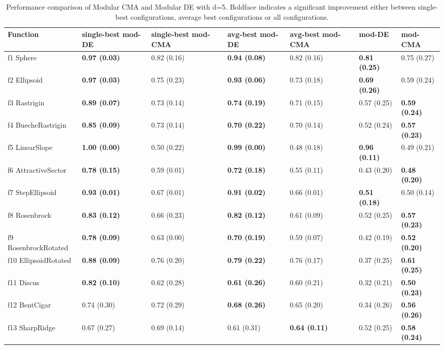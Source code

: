 \begin{table}
\caption{Performance comparison of Modular CMA and Modular DE with d=5. Boldface indicates a significant improvement either between single-best configurations, average best configurations or all configurations.}
\begin{tabular}{lllllll}
\toprule
Function & single-best mod-DE & single-best mod-CMA & avg-best mod-DE & avg-best mod-CMA & mod-DE & mod-CMA \\
\midrule
f1 Sphere & \textbf{0.97 (0.03)} & 0.82 (0.16) & \textbf{0.94 (0.08)} & 0.82 (0.16) & \textbf{0.81 (0.25)} & 0.75 (0.27) \\
f2 Ellipsoid & \textbf{0.97 (0.03)} & 0.75 (0.23) & \textbf{0.93 (0.06)} & 0.73 (0.18) & \textbf{0.69 (0.26)} & 0.59 (0.24) \\
f3 Rastrigin & \textbf{0.89 (0.07)} & 0.73 (0.14) & \textbf{0.74 (0.19)} & 0.71 (0.15) & 0.57 (0.25) & \textbf{0.59 (0.24)} \\
f4 BuecheRastrigin & \textbf{0.85 (0.09)} & 0.73 (0.14) & \textbf{0.70 (0.22)} & 0.70 (0.14) & 0.52 (0.24) & \textbf{0.57 (0.23)} \\
f5 LinearSlope & \textbf{1.00 (0.00)} & 0.50 (0.22) & \textbf{0.99 (0.00)} & 0.48 (0.18) & \textbf{0.96 (0.11)} & 0.49 (0.21) \\
f6 AttractiveSector & \textbf{0.78 (0.15)} & 0.59 (0.01) & \textbf{0.72 (0.18)} & 0.55 (0.11) & 0.43 (0.20) & \textbf{0.48 (0.20)} \\
f7 StepEllipsoid & \textbf{0.93 (0.01)} & 0.67 (0.01) & \textbf{0.91 (0.02)} & 0.66 (0.01) & \textbf{0.51 (0.18)} & 0.50 (0.14) \\
f8 Rosenbrock & \textbf{0.83 (0.12)} & 0.66 (0.23) & \textbf{0.82 (0.12)} & 0.61 (0.09) & 0.52 (0.25) & \textbf{0.57 (0.23)} \\
f9 RosenbrockRotated & \textbf{0.78 (0.09)} & 0.63 (0.00) & \textbf{0.70 (0.19)} & 0.59 (0.07) & 0.42 (0.19) & \textbf{0.52 (0.20)} \\
f10 EllipsoidRotated & \textbf{0.88 (0.09)} & 0.76 (0.20) & \textbf{0.79 (0.22)} & 0.76 (0.17) & 0.37 (0.25) & \textbf{0.61 (0.25)} \\
f11 Discus & \textbf{0.82 (0.10)} & 0.62 (0.28) & \textbf{0.61 (0.26)} & 0.60 (0.21) & 0.32 (0.21) & \textbf{0.50 (0.23)} \\
f12 BentCigar & 0.74 (0.30) & 0.72 (0.29) & \textbf{0.68 (0.26)} & 0.65 (0.20) & 0.34 (0.26) & \textbf{0.56 (0.26)} \\
f13 SharpRidge & 0.67 (0.27) & 0.69 (0.14) & 0.61 (0.31) & \textbf{0.64 (0.11)} & 0.52 (0.25) & \textbf{0.58 (0.24)} \\

\end{tabular}
\end{table}
